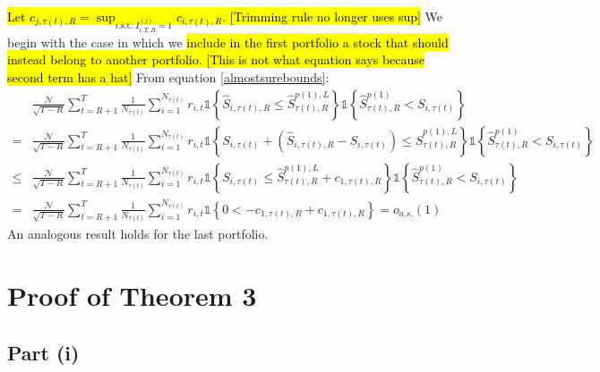 \hl{Let $c_{j,\tau(t) ,R}=\sup_{i\text{.s.t. }I_{i,T,R}^{(j)}=1}c_{i,\tau(t) ,R}$. [Trimming rule no longer uses sup]} We begin with the case in which we \hl{include in the first portfolio a stock that should instead belong to another portfolio. [This is not what equation says because second term has a hat]} From equation \eqref{almostsurebounds}:
\begin{align*}
&\frac{\mathcal{N}}{\sqrt{T-R}}\sum_{t=R+1}^{T}\frac{1}{N_{\tau(t) }}\sum_{i=1}^{N_{\tau(t) }}r_{i,t} \mathds{1} \left\{ \widehat{S}_{i,\tau(t) ,R}\leq \widehat{S}_{\tau(t),R}^{p(1),L}\right\} \mathds{1} \left\{ \widehat{S}_{\tau(t),R}^{p(1)} < S_{i,\tau(t) } \right\}  \\
=&\frac{\mathcal{N}}{\sqrt{T-R}}\sum_{t=R+1}^{T}\frac{1}{N_{\tau(t) }}\sum_{i=1}^{N_{\tau(t) }}r_{i,t} \mathds{1} \left\{ S_{i,\tau(t) }+\left( \widehat{S}_{i,\tau(t),R}-S_{i,\tau(t) }\right) \leq \widehat{S}_{\tau(t) ,R}^{p(1),L}\right\} \mathds{1} \left\{ \widehat{S}_{\tau(t) ,R}^{p(1)} < S_{i,\tau(t) } \right\}  \\
\leq &\frac{\mathcal{N}}{\sqrt{T-R}}\sum_{t=R+1}^{T}\frac{1}{N_{\tau(t) }}\sum_{i=1}^{N_{\tau(t) }}r_{i,t} \mathds{1} \left\{ S_{i,\tau(t) }\leq \widehat{S}_{\tau(t),R}^{p(1),L}+c_{1,\tau(t),R} \right\} \mathds{1} \left\{ \widehat{S}_{\tau(t) ,R}^{p(1)} < S_{i,\tau(t) } \right\} \\
= &\frac{\mathcal{N}}{\sqrt{T-R}}\sum_{t=R+1}^{T}\frac{1}{N_{\tau(t) }}\sum_{i=1}^{N_{\tau(t) }}r_{i,t} \mathds{1} \left\{0 < -c_{1,\tau(t) ,R}+c_{1,\tau(t),R}\right\} =o_{a.s.}(1)
\end{align*} 
An analogous result holds for the last portfolio.



\section{Proof of Theorem 3}
\label{Proof of th:feasible}

\subsection{Part (i)}


